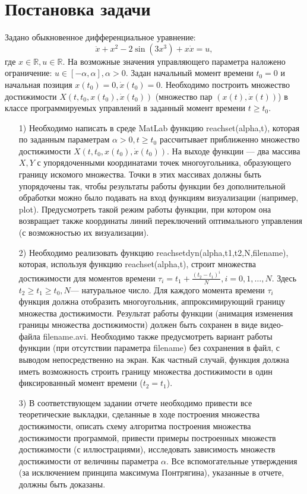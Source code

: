 \documentclass[11pt]{article}
\begin{document}
	\newpage
	\tableofcontents
	\newpage
	{\vspace*{-2cm} \hspace*{-1cm}\section{Постановка задачи}}
	{Задано обыкновенное дифференциальное уравнение:}
	\begin{equation}
		\ddot x + x^2 - 2\sin(3x^3) + x \dot x = u,
	\end{equation}  
	{где $x \in \mathbb{R}, u \in \mathbb{R}.$ На возможные значения управляющего параметра наложено ограничение: $u \in [-\alpha, \alpha], \alpha > 0.$ Задан начальный момент времени $t_0 = 0$ и начальная позиция $x(t_0) = 0, \dot x(t_0) = 0.$ Необходимо построить множество достижимости $X(t,t_0,x(t_0),\dot x(t_0))$ (множество пар $(x(t), \dot x(t))$) в классе программируемых управлений в заданный момент времени $t \geq t_0$.}
	\begin{itemize}
		\item [1)]{Необходимо написать в среде MatLab функцию reachset(alpha,t), которая по заданным параметрам $\alpha > 0, t \geq t_0$ рассчитывает приближенно множество достижимости $X(t,t_0,x(t_0), \dot x(t_0)).$ На выходе функции --- два массива $X,Y$ с упорядоченными координатами точек многоугольника, образующего границу искомого множества. Точки в этих массивах должны быть упорядочены так, чтобы результаты работы функции без дополнительной обработки можно было подавать на вход функциям визуализации (например, plot). Предусмотреть такой режим работы функции, при котором она возвращает также координаты линий переключений оптимального управления (с возможностью их визуализации).}
		\item [2)]{Необходимо реализовать функцию reachsetdyn(alpha,t1,t2,N,filename), которая, используя функцию reachset(alpha,t), строит множества достижимости для моментов времени $\tau_i = t_1 + \frac{(t_2 - t_1)^i}{N}, i = 0,1,\ldots, N$. Здесь $t_2 \geq t_1 \geq t_0, N$--- натуральное число. Для каждого момента времени $\tau_i$ функция должна отобразить многоугольник, аппроксимирующий границу множества достижимости. Результат работы функции (анимация изменения границы множества достижимости) должен быть сохранен в виде видео-файла filename.avi. Необходимо также предусмотреть вариант работы функции (при отсутствии параметра filename) без сохранения в файл, с выводом непосредственно на экран. Как частный случай, функция должна иметь возможность строить границу множества достижимости в один фиксированный момент времени ($t_2 = t_1$).}
		\item [3)]{В соответствующем задании отчете необходимо привести все теоретические выкладки, сделанные в ходе построения множества достижимости, описать схему алгоритма построения множества достижимости программой, привести примеры построенных множеств достижимости (с иллюстрациями), исследовать зависимость множеств достижимости от величины параметра $\alpha$. Все вспомогательные утверждения (за исключением принципа максимума Понтрягина), указанные в отчете, должны быть доказаны.}
	\end{itemize}
	
\end{document}
